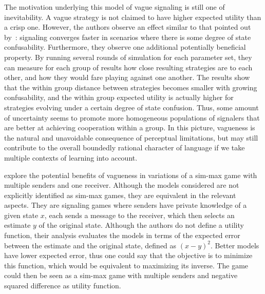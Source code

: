 \documentclass[a4paper]{article}
\begin{document}
The motivation underlying this model of vague signaling is still one of inevitability.
A vague strategy is not claimed to have higher expected utility than a crisp one.
However, the authors observe an effect similar to that pointed out by~\citeauthor{oconnor_evolution_2014}: signaling converges faster in scenarios where there is some degree of state confusability.
Furthermore, they observe one additional potentially beneficial property.
By running several rounds of simulation for each parameter set, they can measure for each group of results how close resulting strategies are to each other, and how they would fare playing against one another.
The results show that the within group distance between strategies becomes smaller with growing confusability, and the within group expected utility is actually higher for strategies evolving under a certain degree of state confusion.
Thus, some amount of uncertainty seems to promote more homogeneous populations of signalers that are better at achieving cooperation within a group.
In this picture, vagueness is the natural and unavoidable consequence of perceptual limitations, but may still contribute to the overall boundedly rational character of language if we take multiple contexts of learning into account.

\textcite{lawry_vagueness_2017} explore the potential benefits of vagueness in variations of a sim-max game with multiple senders and one receiver.
Although the models considered are not explicitly identified as sim-max games, they are equivalent in the relevant aspects.
They are signaling games where senders have private knowledge of a given state $x$, each sends a message to the receiver, which then selects an estimate $y$ of the original state.
Although the authors do not define a utility function, their analysis evaluates the models in terms of the expected error between the estimate and the original state, defined as $(x-y)^2$.
Better models have lower expected error, thus one could say that the objective is to minimize this function, which would be equivalent to maximizing its inverse.
The game could then be seen as a sim-max game with multiple senders and negative squared difference as utility function.
\end{document}
